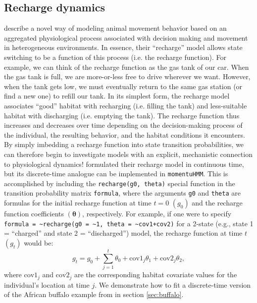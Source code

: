 \documentclass[12pt]{article}\usepackage[]{graphicx}\usepackage[]{xcolor}
\begin{document}
\subsection{Recharge dynamics}
\label{sec:recharge}
\cite{HootenEtAl2019} describe a novel way of modeling animal movement behavior based on an aggregated physiological process associated with decision making and movement in heterogeneous environments. In essence, their ``recharge'' model allows state switching to be a function of this process (i.e. the recharge function). For example, we can think of the recharge function as the gas tank of our car. When the gas tank is full, we are more-or-less free to drive wherever we want. However, when the tank gets low, we must eventually return to the same gas station (or find a new one) to refill our tank. In its simplest form, the recharge model associates ``good'' habitat with recharging (i.e. filling the tank) and less-suitable habitat with discharging (i.e. emptying the tank). The recharge function thus increases and decreases over time depending on the decision-making process of the individual, the resulting behavior, and the habitat conditions it encounters. By simply imbedding a recharge function into state transition probabilities, we can therefore begin to investigate models with an explicit, mechanistic connection to physiological dynamics! \cite{HootenEtAl2019} formulated their recharge model in continuous time, but its discrete-time analogue can be implemented in \verb|momentuHMM|. This is accomplished by including the \verb|recharge(g0, theta)| special function in the transition probability matrix \verb|formula|, where the arguments \verb|g0| and \verb|theta| are formulas for the initial recharge function at time $t=0$ $(g_0)$ and the recharge function coefficients $({\boldsymbol \theta})$, respectively. For example, if one were to specify \verb|formula = ~recharge(g0 = ~1, theta = ~cov1+cov2)| for a 2-state (e.g., state 1 = ``charged'' and state 2 = ``discharged'') model, the recharge function at time $t$ $(g_t)$ would be:
\begin{equation*}
  g_t = g_0 + \sum_{j=1}^t \theta_0 + \text{cov1}_j \theta_1 + \text{cov2}_j \theta_2,
\end{equation*}
where $\text{cov1}_j$ and $\text{cov2}_j$ are the corresponding habitat covariate values for the individual's location at time $j$. We demonstrate how to fit a discrete-time version of the African buffalo example from \cite{HootenEtAl2019} in section \ref{sec:buffalo}. 
\end{document}
